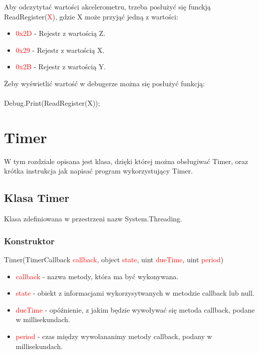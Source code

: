\documentclass{article}
\begin{document}
Aby odczytytać wartości akcelerometru, trzeba posłużyć się funckją \\ReadRegister(\textcolor{red}{X}), gdzie X może przyjąć jedną z wartości:
\begin{itemize}
\item \textcolor{red}{0x2D} - Rejestr z wartością Z.
\item \textcolor{red}{0x29} - Rejestr z wartością X.
\item \textcolor{red}{0x2B} - Rejestr z wartością Y.
\end{itemize}
Żeby wyświetlić wartość w debugerze można się posłużyć funkcją:\\\\

Debug.Print(ReadRegister(X));

\section{Timer}
W tym rozdziale opisana jest klasa, dzięki której można obsługiwać Timer, oraz krótka instrukcja jak napisać program wykorzystujący Timer.
\subsection{Klasa Timer}
Klasa zdefiniowana w przestrzeni nazw System.Threading.
\subsubsection{Konstruktor}
Timer(TimerCallback \textcolor{red}{callback}, object \textcolor{red}{state}, uint \textcolor{red}{dueTime}, uint \textcolor{red}{period})
\begin{itemize}
\item \textcolor{red}{callback} - nazwa metody, która ma być wykonywana.
\item \textcolor{red}{state} - obiekt z informacjami wykorzysytwanych w metodzie callback lub null.
\item \textcolor{red}{dueTime} - opóźnienie, z jakim będzie wywoływać się metoda callback, podane w millisekundach.
\item \textcolor{red}{period} - czas między wywołananimy metody callback, podany w millisekundach.
\end{itemize}
\end{document}
